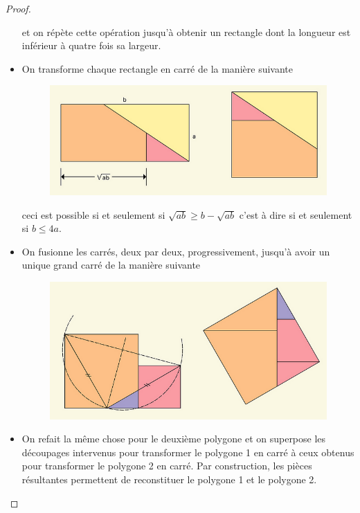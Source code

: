 \begin{proof}
\begin{itemize}
\begin{figure}[h]
    \end{figure}

    et on répète cette opération jusqu'à obtenir un rectangle dont la longueur est inférieur à quatre fois sa largeur.
    \item On transforme chaque rectangle en carré de la manière suivante
    \newpage

    \begin{figure}[h]
        \centering
        \includegraphics[scale=0.6]{images/x3.png}

    \end{figure}

    ceci est possible si et seulement si $\sqrt{ab} \ge b-\sqrt{ab}$ c'est à dire si et seulement si $b \le 4a$.
    \item On fusionne les carrés, deux par deux, progressivement, jusqu'à avoir un unique grand carré de la manière suivante
    \begin{figure}[h]
        \centering
        \includegraphics[scale=0.6]{images/x4.png}

    \end{figure}
    \item On refait la même chose pour le deuxième polygone et on superpose les découpages intervenus pour transformer le polygone 1 en carré à ceux obtenus pour transformer le polygone 2 en carré. Par construction, les pièces résultantes permettent de reconstituer le polygone 1 et le polygone 2.
  \end{itemize}

\end{proof}
